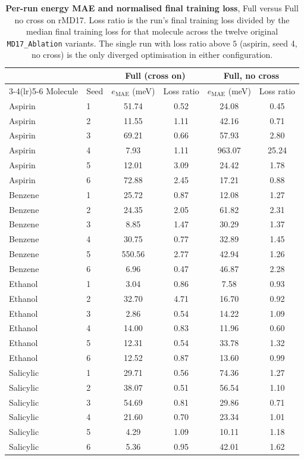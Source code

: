 \begin{table}[!htbp]
\centering
\caption{\textbf{Per-run energy MAE and normalised final training loss}, Full versus Full no cross on rMD17. Loss ratio is the run's final training loss divided by the median final training loss for that molecule across the twelve original \texttt{MD17\_Ablation} variants. The single run with loss ratio above $5$ (aspirin, seed 4, no cross) is the only diverged optimisation in either configuration.}
\label{tab:cross_perrun}
\setlength{\tabcolsep}{6pt}
\begin{tabular}{llcccc}
\toprule
& & \multicolumn{2}{c}{\textbf{Full (cross on)}} & \multicolumn{2}{c}{\textbf{Full, no cross}} \\
\cmidrule(lr){3-4}\cmidrule(lr){5-6}
Molecule & Seed & $e_\mathrm{MAE}$ (meV) & Loss ratio & $e_\mathrm{MAE}$ (meV) & Loss ratio \\
\midrule
Aspirin & 1 & 51.74 & 0.52 & 24.08 & 0.45 \\
Aspirin & 2 & 11.55 & 1.11 & 42.16 & 0.71 \\
Aspirin & 3 & 69.21 & 0.66 & 57.93 & 2.80 \\
Aspirin & 4 & 7.93 & 1.11 & 963.07 & 25.24 \\
Aspirin & 5 & 12.01 & 3.09 & 24.42 & 1.78 \\
Aspirin & 6 & 72.88 & 2.45 & 17.21 & 0.88 \\
Benzene & 1 & 25.72 & 0.87 & 12.08 & 1.27 \\
Benzene & 2 & 24.35 & 2.05 & 61.82 & 2.31 \\
Benzene & 3 & 8.85 & 1.47 & 30.29 & 1.37 \\
Benzene & 4 & 30.75 & 0.77 & 32.89 & 1.45 \\
Benzene & 5 & 550.56 & 2.77 & 42.94 & 1.26 \\
Benzene & 6 & 6.96 & 0.47 & 46.87 & 2.28 \\
Ethanol & 1 & 3.04 & 0.86 & 7.58 & 0.93 \\
Ethanol & 2 & 32.70 & 4.71 & 16.70 & 0.92 \\
Ethanol & 3 & 2.86 & 0.54 & 14.22 & 1.09 \\
Ethanol & 4 & 14.00 & 0.83 & 11.96 & 0.60 \\
Ethanol & 5 & 12.31 & 0.54 & 33.78 & 1.32 \\
Ethanol & 6 & 12.52 & 0.87 & 13.60 & 0.99 \\
Salicylic & 1 & 29.71 & 0.56 & 74.36 & 1.27 \\
Salicylic & 2 & 38.07 & 0.51 & 56.54 & 1.10 \\
Salicylic & 3 & 54.69 & 0.81 & 29.86 & 0.71 \\
Salicylic & 4 & 21.60 & 0.70 & 23.34 & 1.01 \\
Salicylic & 5 & 4.29 & 1.09 & 10.11 & 1.18 \\
Salicylic & 6 & 5.36 & 0.95 & 42.01 & 1.62 \\
\bottomrule
\end{tabular}
\end{table}

